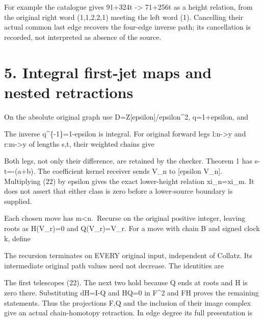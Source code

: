 For example the catalogue gives 91+324t -\textgreater{} 71+256t as a
height relation, from the original right word (1,1,2,2,1) meeting the
left word (1). Cancelling their actual common last edge recovers the
four-edge inverse path; its cancellation is recorded, not interpreted as
absence of the source.

\section{5. Integral first-jet maps and nested retractions}

On the absolute original graph use D=Z{[}epsilon{]}/epsilon\^{}2,
q=1+epsilon, and


The inverse q\^{}\{-1\}=1-epsilon is integral. For original forward legs
l:n-\textgreater y and r:m-\textgreater y of lengths s,t, their weighted
chains give


Both legs, not only their difference, are retained by the checker.
Theorem 1 has s-t=-(a+b). The coefficient kernel receiver sends V\_n to
{[}epsilon V\_n{]}. Multiplying (22) by epsilon gives the exact
lower-height relation xi\_n=xi\_m. It does not assert that either class
is zero before a lower-source boundary is supplied.

Each chosen move has m\textless n.~Recurse on the original positive
integer, leaving roots as H(V\_r)=0 and Q(V\_r)=V\_r. For a move with
chain B and signed clock k, define


The recursion terminates on EVERY original input, independent of
Collatz. Its intermediate original path values need not decrease. The
identities are


The first telescopes (22). The next two hold because Q ends at roots and
H is zero there. Substituting dH=I-Q and HQ=0 in F\^{}2 and FH proves
the remaining statements. Thus the projections F,Q and the inclusion of
their image complex give an actual chain-homotopy retraction. In edge
degree its full presentation is


